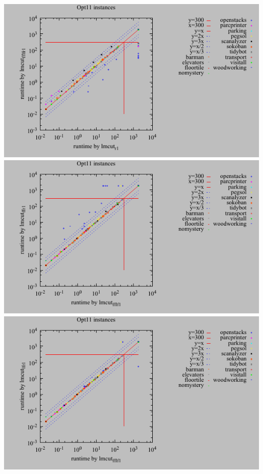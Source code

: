 \includegraphics{tables/opt11-time-lmcut_r-lmcut_fflfr.pdf}
\linebreak
\includegraphics{tables/opt11-time-lmcut_fflf-lmcut_ffr.pdf}
\linebreak
\includegraphics{tables/opt11-time-lmcut_fflf-lmcut_lfr.pdf}
\linebreak
